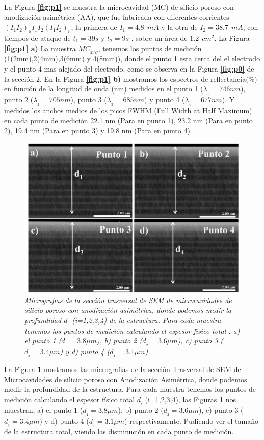 \documentclass[a4paper,11pt,]{book}
\begin{document}
La Figura \textbf{\ref{fig:p1}} se muestra la microcavidad (MC) de silicio poroso con anodización asimétrica (AA), que fue fabricada con diferentes  corrientes $(I_1I_2)_5I_1I_2(I_1I_2)_5$, la primera de $I_1=4.8 \ \  mA$ y la otra de  $I_2=38.7 \ \  mA$, con tiempos de ataque de $t_1=39s$ y $t_2=9s$ , sobre un área de $1.2 \ \ cm^2$. La Figura \textbf{\ref{fig:p1} a)} La muestra $MC_{_{21^{\circ} C}}$, tenemos los puntos de medición (1(2mm),2(4mm),3(6mm) y 4(8mm)), donde el punto 1 esta  cerca del el electrodo y el punto 4 mas alejado del electrodo, como se  observa en la Figura \textbf{\ref{fig:p0}} de la sección 2. En la Figura \textbf{\ref{fig:p1} b)}  mostramos los espectros de reflectancia($\%$) en función de la longitud de onda (nm)  medidos en el punto 1 ($\lambda_{_{1}}=746 nm$), punto 2 ($\lambda_{_{2}}=705 nm$), punto 3 ($\lambda_{_{3}}=685 nm$) y punto 4 ($\lambda_{_{4}}=677 nm$). Y medidos los anchos medios de los picos FWHM (Full Width at Half Maximum) en cada punto de medición  22.1 nm (Para en punto 1),  23.2 nm (Para en punto 2),  19.4 nm (Para en punto 3) y  19.8 nm (Para en punto 4). 
\begin{figure}[H]
	\centering
	\includegraphics[scale=.3]{../Images/Sem1}
	\caption{\emph{Micrografias de la sección trasversal de SEM de  microcavidades de silicio poroso con anodización asimétrica, donde podemos medir la profundidad $d_{_{i}}$ (i=1,2,3,4) de la estructura. Para cada muestra tenemos los puntos de medición calculando  el espesor físico total : a) el punto 1 ($d_{_{1}}=3.8 \mu m$), b) punto 2 ($d_{_{2}}=3.6 \mu m$), c) punto 3 ($d_{_{3}}= 3.4 \mu m$) y d) punto 4 ($d_{_{4}}=3.1 \mu m$).}}
	\label{fig:p2}
\end{figure}
La Figura \textbf{\ref{fig:p2}} mostramos las micrografias de la sección Trasversal de SEM de  Microcavidades de silicio poroso con Anodización Asimétrica, donde podemos medir la profundidad de la estructura. Para cada muestra tenemos los puntos de medición calculando  el espesor físico total $d_{_{i}}$ (i=1,2,3,4), las Figuras \textbf{\ref{fig:p2}} nos muestran,   a) el punto 1 ($d_{_{1}}=3.8 \mu m$), b) punto 2 ($d_{_{2}}=3.6 \mu m$), c) punto 3 ($d_{_{3}}= 3.4 \mu m$) y d) punto 4 ($d_{_{4}}=3.1 \mu m$) respectivamente. Pudiendo ver  el tamaño de la estructura total, viendo las disminución en cada punto de medición.
\end{document}
